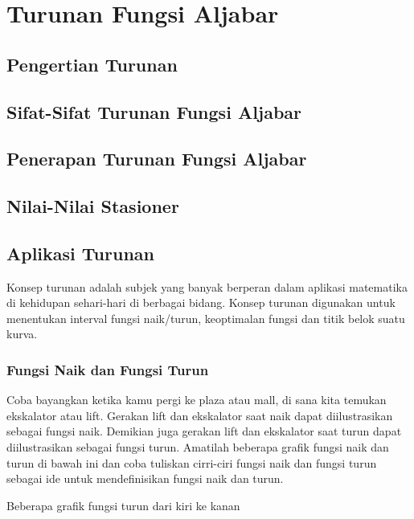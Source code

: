 \documentclass[11pt,fleqn]{book} %
\begin{document}

\chapter{Turunan Fungsi Aljabar}

\section{Pengertian Turunan}

\section{Sifat-Sifat Turunan Fungsi Aljabar}

\section{Penerapan Turunan Fungsi Aljabar}

\section{Nilai-Nilai Stasioner}

\section{Aplikasi Turunan}
Konsep turunan adalah subjek yang banyak berperan dalam aplikasi matematika di kehidupan sehari-hari di berbagai bidang. Konsep turunan digunakan untuk
menentukan interval fungsi naik/turun, keoptimalan fungsi dan titik belok suatu kurva.
\subsection{Fungsi Naik dan Fungsi Turun}
Coba bayangkan ketika kamu pergi ke plaza atau mall, di sana kita temukan ekskalator atau lift. Gerakan lift dan ekskalator saat naik dapat diilustrasikan sebagai fungsi naik. Demikian juga gerakan lift dan ekskalator saat turun dapat diilustrasikan sebagai fungsi turun. Amatilah beberapa grafik fungsi naik dan turun di bawah ini dan coba tuliskan cirri-ciri fungsi naik dan fungsi turun sebagai ide untuk mendefinisikan fungsi naik dan turun.

Beberapa grafik fungsi turun dari kiri ke kanan
\end{document}
